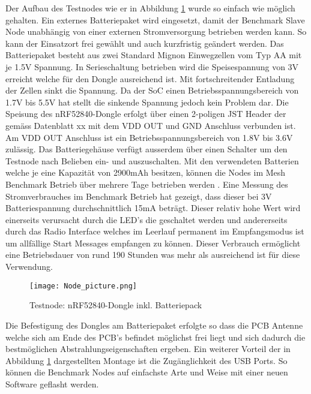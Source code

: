 Der Aufbau des Testnodes wie er in Abbildung \ref{fig:TestnodenRF52840-DongleinklBatteriepack} wurde so einfach wie möglich gehalten. Ein externes Batteriepaket wird eingesetzt, damit der Benchmark Slave Node unabhängig von einer externen Stromversorgung betrieben werden kann. So kann der Einsatzort frei gewählt und auch kurzfristig geändert werden.
Das Batteriepaket besteht aus zwei Standard Mignon Einwegzellen vom Typ AA mit je 1.5V Spannung. In Serieschaltung betrieben wird die Speisespannung von 3V erreicht welche für den Dongle ausreichend ist. Mit fortschreitender Entladung der Zellen sinkt die Spannung. Da der SoC einen Betriebsspannungsbereich von 1.7V bis 5.5V hat stellt die sinkende Spannung jedoch kein Problem dar.
Die Speisung des nRF52840-Dongle erfolgt über einen 2-poligen JST Header der gemäss Datenblatt xx mit dem VDD OUT und GND Anschluss verbunden ist. Am VDD OUT Anschluss ist ein Betriebsspannungsbereich von 1.8V bis 3.6V zulässig.
Das Batteriegehäuse verfügt ausserdem über einen Schalter um den Testnode nach Belieben ein- und auszuschalten.
Mit den verwendeten Batterien welche je eine Kapazität von 2900mAh besitzen, können die Nodes im Mesh Benchmark Betrieb über mehrere Tage betrieben werden \cite{distrelec_schweiz_ag_rnd_2020}.
Eine Messung des Stromverbrauches im Benchmark Betrieb hat gezeigt, dass dieser bei 3V Batteriespannung durchschnittlich 15mA beträgt. Dieser relativ hohe Wert wird einerseits verursacht durch die LED's die geschaltet werden und andererseits durch das Radio Interface welches im Leerlauf permanent im Empfangsmodus ist um allfällige Start Messages empfangen zu können. 
Dieser Verbrauch ermöglicht eine Betriebsdauer von rund 190 Stunden was mehr als ausreichend ist für diese Verwendung.

\begin{figure} [H]
	\centering
	\texttt{[image: Node\_picture.png]}
	\caption{Testnode: nRF52840-Dongle inkl. Batteriepack}
	\label{fig:TestnodenRF52840-DongleinklBatteriepack}
\end{figure}

Die Befestigung des Dongles am Batteriepaket erfolgte so dass die PCB Antenne welche sich am Ende des PCB's befindet möglichst frei liegt und sich dadurch die bestmöglichen Abstrahlungseigenschaften ergeben. Ein weiterer Vorteil der in Abbildung \ref{fig:TestnodenRF52840-DongleinklBatteriepack} dargestellten Montage ist die Zugänglichkeit des USB Ports. So können die Benchmark Nodes auf einfachste Arte und Weise mit einer neuen Software geflasht werden.

